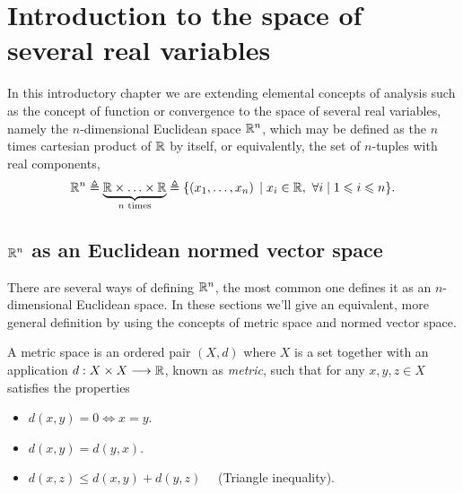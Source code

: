 \chapter[Introduction to the space of several real variables]{Introduction to the space of \\ several real variables}
\thispagestyle{noheaders}

In this introductory chapter we are extending elemental concepts of analysis such as the concept of function or 
convergence to the space of several real variables, namely the $n$-dimensional Euclidean space $\Rtn$, which may be defined 
as the $n$ times cartesian product of $\R$ by itself, or equivalently, the set of $n$-tuples with real components,
\begin{equation}
\Rtn\bydef\underbrace{\R\times\ldots\times\R}_{n\textrm{ times}} \bydef \{\left(x_1, \ldots, x_n\right)\st x_i\in\R,\ \forall i\st
1 \leq i \leq n\}.
\end{equation}

\section{$\Rtn$ as an Euclidean normed vector space}

There are several ways of defining $\Rtn$, the most common one defines it as an $n$-dimensional Euclidean space. In these 
sections we'll give an equivalent, more general definition by using the concepts of metric space and normed vector space.


\begin{defn}\label{def:metric-space}
A metric space is an ordered pair $\left(X, d\right)$ where $X$ is a set together with an application 
$\appl{d}{X\times X}{\R}$, known as \textit{metric}, such that for any $x, y, z\in X$ satisfies the properties
\begin{itemize}[itemsep = -2pt]
	\item $d(x, y) = 0\iff x = y$.
	\item $d(x, y) = d(y, x)$.
	\item $d(x, z) \leq d(x, y) + d(y, z)\quad$ (Triangle inequality).
\end{itemize}
\end{defn}

